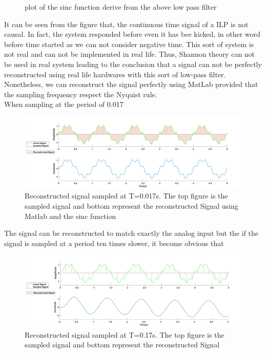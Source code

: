 \documentclass[12pt,letterpaper]{article}
\begin{document}
\begin{itemize}
\begin{figure}[h]
            \caption{plot of the sinc function derive from the above low pass filter}
    \end{figure}
    It can be seen from the figure that, the continuous time signal of a ILP is not causal. In fact, the system
    responded before even it has bee kicked, in other word before time started as we can not consider negative time.
    This sort of system is not real and can not be implemented in real life. Thus, Shannon theory can not be used 
    in real system leading to the conclusion that a signal can not be perfectly reconstructed using real life
    hardwares with this sort of low-pass filter. Nonetheless, we can reconstruct the signal
    perfectly using MatLab provided that the sampling frequency respect the Nyquist rule.\\
    When sampling at the period of 0.017
    \begin{figure}[h]
        \centering
            \includegraphics[width=15cm]{Reconstructed_0017.jpg}
            \caption{Reconstructed signal sampled at T=0.017s. The top figure
            is the sampled signal and bottom represent the reconstructed Signal
            using Matlab and the sinc function}
    \end{figure}
    The signal can be reconstructed to match exactly the analog input
    but the if the signal is sampled at a period ten times slower, it become obvious that
    \begin{figure}[h]
        \centering
            \includegraphics[width=15cm]{Reconstructed_017.jpg}
            \caption{Reconstructed signal sampled at T=0.17s. The top figure
            is the sampled signal and bottom represent the reconstructed Signal
}
\end{figure}
\end{itemize}
\end{document}
